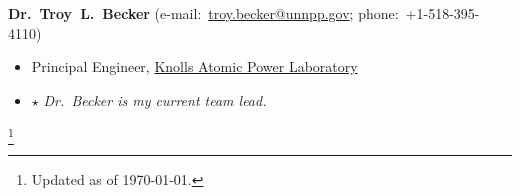 \documentclass[10pt]{article}
\newcommand\blfootnote[1]{%
  \begingroup
  \renewcommand\thefootnote{}\footnote{\normalsize #1}%
  \addtocounter{footnote}{-1}%
  \endgroup
}
\newenvironment{innerlist}[1][\enskip\textbullet]%
        {\begin{itemize}[#1,leftmargin=*,parsep=0pt,itemsep=0pt,topsep=0pt,partopsep=0pt]}
        {\end{itemize}}
\newcommand{\halfblankline}{\quad\vspace{-0.5\baselineskip}\pagebreak[3]}
\begin{document}
\halfblankline

{\textbf{Dr.~Troy~L.~Becker}}
(e-mail:~\href{mailto:troy.becker@unnpp.gov}{troy.becker@unnpp.gov}; phone:~+1-518-395-4110)
\begin{innerlist}
    \item Principal Engineer,
        \href{https://navalnuclearlab.energy.gov/}{Knolls Atomic Power Laboratory}


    \item[$\star$] \emph{Dr.~Becker is my current team lead.}
\end{innerlist}

\blfootnote{Updated as of \today.}
\end{document}
